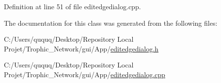 Definition at line 51 of file editedgedialog.\+cpp.



The documentation for this class was generated from the following files\+:\begin{DoxyCompactItemize}
\item 
C\+:/\+Users/ququq/\+Desktop/\+Repository Local Projet/\+Trophic\+\_\+\+Network/gui/\+App/\mbox{\hyperlink{editedgedialog_8h}{editedgedialog.\+h}}\item 
C\+:/\+Users/ququq/\+Desktop/\+Repository Local Projet/\+Trophic\+\_\+\+Network/gui/\+App/\mbox{\hyperlink{editedgedialog_8cpp}{editedgedialog.\+cpp}}\end{DoxyCompactItemize}
